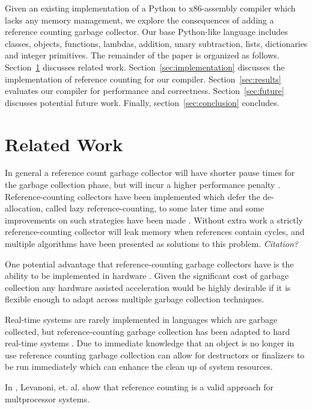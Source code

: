 \documentclass{sigplanconf}
\begin{document}
Given an existing implementation of a Python to x86-assembly compiler which lacks any memory management, we explore the consequences of adding a reference counting garbage collector.  Our base Python-like language includes classes, objects, functions, lambdas, addition, unary subtraction, lists, dictionaries and integer primitives.  The remainder of the paper is organized as follows.  Section~\ref{sec:related} discusses related work.  Section~\ref{sec:implementation} discusses the implementation of reference counting for our compiler.  Section~\ref{sec:results} evaluates our compiler for performance and correctness.  Section~\ref{sec:future} discusses potential future work.  Finally, section~\ref{sec:conclusion} concludes.


\section{Related Work}
\label{sec:related}
In general a reference count garbage collector will have shorter pause times for the garbage collection phase, but will incur a higher performance penalty \cite{joisha}\cite{blackburn}.  Reference-counting collectors have been implemented which defer the de-allocation, called lazy reference-counting, to some later time and some improvements on such strategies have been made \cite{boehm}.  Without extra work a strictly reference-counting collector will leak memory when references contain cycles, and multiple algorithms have been presented as solutions to this problem. \textit{Citation?}

One potential advantage that reference-counting garbage collectors have is the ability to be implemented in hardware \cite{joao}.  Given the significant cost of garbage collection \cite{hertz} any hardware assisted acceleration would be highly desirable if it is flexible enough to adapt across multiple garbage collection techniques. 

Real-time systems are rarely implemented in languages which are garbage collected, but reference-counting garbage collection has been adapted to hard real-time systems \cite{ritzaou}.  Due to immediate knowledge that an object is no longer in use reference counting garbage collection can allow for destructors or finalizers to be run immediately which can enhance the clean up of system resources.

In \cite{levanoni}, Levanoni, et. al. show that reference counting is a valid approach for multprocessor systems.

\par
\end{document}
